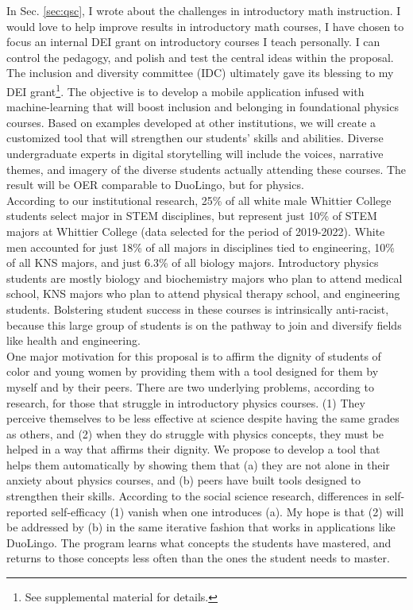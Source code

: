 \documentclass[../../../main.tex]{subfiles}
\begin{document}
\label{sec:dei}

In Sec. \ref{sec:qsc}, I wrote about the challenges in introductory math instruction.  I would love to help improve results in introductory math courses, I have chosen to focus an internal DEI grant on introductory courses I teach personally.  I can control the pedagogy, and polish and test the central ideas within the proposal.  The inclusion and diversity committee (IDC) ultimately gave its blessing to my DEI grant\footnote{See supplemental material for details.}.  The objective is to develop a mobile application infused with machine-learning that will boost inclusion and belonging in foundational physics courses.  Based on examples developed at other institutions, we will create a customized tool that will strengthen our students’ skills and abilities. Diverse undergraduate experts in digital storytelling will include the voices, narrative themes, and imagery of the diverse students actually attending these courses. The result will be OER comparable to DuoLingo, but for physics.
\\
\vspace{0.15cm}
According to our institutional research, 25\% of all white male Whittier College students select major in STEM disciplines, but represent just 10\% of STEM majors at Whittier College (data selected for the period of 2019-2022). White men accounted for just 18\% of all majors in disciplines tied to engineering, 10\% of all KNS majors, and just 6.3\% of all biology majors. Introductory physics students are mostly biology and biochemistry majors who plan to attend medical school, KNS majors who plan to attend physical therapy school, and engineering students. Bolstering student success in these courses is intrinsically anti-racist, because this large group of students is on the pathway to join and diversify fields like health and engineering.
\\
\vspace{0.15cm}
One major motivation for this proposal is to affirm the dignity of students of color and young women by providing them with a tool designed for them by myself and by their peers. There are two underlying problems, according to research, for those that struggle in introductory physics courses. (1) They perceive themselves to be less effective at science despite having the same grades as others, and (2) when they do struggle with physics concepts, they must be helped in a way that affirms their dignity. We propose to develop a tool that helps them automatically by showing them that (a) they are not alone in their anxiety about physics courses, and (b) peers have built tools designed to strengthen their skills. According to the social science research, differences in self-reported self-efficacy (1) vanish when one introduces (a).  My hope is that (2) will be addressed by (b) in the same iterative fashion that works in applications like DuoLingo.  The program learns what concepts the students have mastered, and returns to those concepts less often than the ones the student needs to master.
\end{document}
